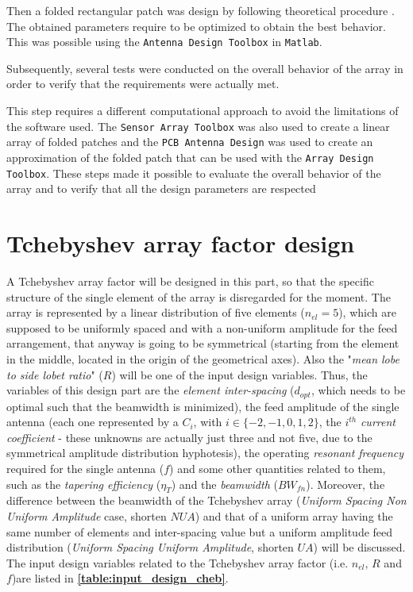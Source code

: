 \documentclass[10 pt,a4paper,twocolumn]{article}
\begin{document}
{Then a folded rectangular patch was design by following theoretical procedure \textbf{\cite{Balanis1}}. The obtained parameters require to be optimized to obtain the best behavior. This was possible using the \texttt{Antenna Design Toolbox} in \texttt{Matlab}.

Subsequently, several tests were conducted on the overall behavior of the array in order to verify that the requirements were actually met. 

This step requires a different computational approach to avoid the limitations of the software used. The \texttt{Sensor Array Toolbox} was also used to create a linear array of folded patches and the \texttt{PCB Antenna Design} was used to create an approximation of the folded patch that can be used with the \texttt{Array Design Toolbox}. These steps made it possible to evaluate the overall behavior of the array and to verify that all the design parameters are respected

	
\section*{Tchebyshev array factor design}

\indent A Tchebyshev array factor will be designed in this part, so that the specific structure of the single element of the array is disregarded for the moment. The array is represented by a linear distribution of five elements ($n_{el}=5$), which are supposed to be uniformly spaced and with a non-uniform amplitude for the feed arrangement, that anyway is going to be symmetrical (starting from the element in the middle, located in the origin of the geometrical axes). Also the "\emph{mean lobe to side lobet ratio}" ($R$) will be one of the input design variables. Thus, the variables of this design part are the \emph{element inter-spacing} ($d_{opt}$, which needs to be optimal such that the beamwidth is minimized), the feed amplitude of the single antenna (each one represented by a $C_i$, with $i\in\{-2,-1,0,1,2\}$, the $i^{th}$ \emph{current coefficient} - these unknowns are actually just three and not five, due to the symmetrical amplitude distribution hyphotesis), the operating \emph{resonant frequency} required for the single antenna ($f$) and some other quantities related to them, such as the \emph{tapering efficiency} ($\eta_T$) and the \emph{beamwidth} ($BW_{fn}$). Moreover, the difference between the beamwidth of the Tchebyshev array (\emph{Uniform Spacing Non Uniform Amplitude} case, shorten $NUA$) and  that of a uniform array having the same number of elements and inter-spacing value but a uniform amplitude feed distribution  (\emph{Uniform Spacing Uniform Amplitude}, shorten $UA$) will be discussed. The input design variables related to the Tchebyshev array factor (i.e. $n_{el}$, $R$ and $f$)are listed in \textbf{\cref{table:input_design_cheb}}. 

}
\end{document}
